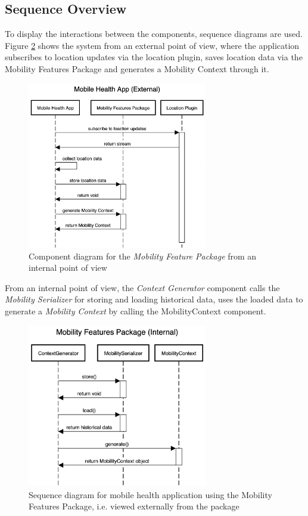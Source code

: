 \subsection{Sequence Overview}
To display the interactions between the components, sequence diagrams are used. Figure \ref{fig:sequence-diagram-external} shows the system from an external point of view, where the application subscribes to location updates via the location plugin, saves location data via the Mobility Features Package and generates a Mobility Context through it. 

\begin{figure}[h]
\centering
\includegraphics[width=0.7\textwidth]{images/diagrams/sequence-external.png}
\caption{Component diagram for the \textit{Mobility Feature Package} from an internal point of view}
\label{fig:sequence-diagram-internal}
\end{figure}

From an internal point of view, the \textit{Context Generator} component calls the \textit{Mobility Serializer} for storing and loading historical data, uses the loaded data to generate a \textit{Mobility Context} by calling the MobilityContext component.
\begin{figure}[h]
\centering
\includegraphics[width=0.7\textwidth]{images/diagrams/sequence-internal.png}
\caption{Sequence diagram for mobile health application using the Mobility Features Package, i.e. viewed externally from the package}
\label{fig:sequence-diagram-external}
\end{figure}